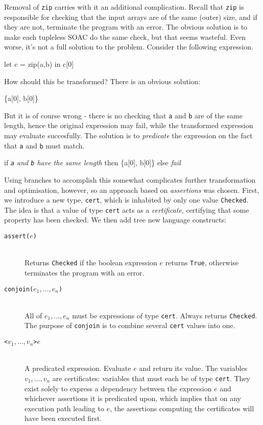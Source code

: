 Removal of \texttt{zip} carries with it an additional complication.
Recall that \texttt{zip} is responsible for checking that the input
arrays are of the same (outer) size, and if they are not, terminate
the program with an error.  The obvious solution is to make each
tupleless SOAC do the same check, but that seems wasteful.  Even
worse, it's not a full solution to the problem.  Consider the
following expression.
\begin{colorcode}
let c = zip(a,b) in
c[0]
\end{colorcode}
How should this be transformed?  There is an obvious solution:
\begin{colorcode}
\{a[0], b[0]\}
\end{colorcode}
But it is of course wrong - there is no checking that \texttt{a} and
\texttt{b} are of the same length, hence the original expression may
fail, while the transformed expression may evaluate succesfully.  The
solution is to \textit{predicate} the expression on the fact that
\texttt{a} and \texttt{b} must match.
\begin{colorcode}
if \textit{\texttt{a} and \texttt{b} have the same length}
then \{a[0], b[0]\}
else \textit{fail}
\end{colorcode}
Using branches to accomplish this somewhat complicates further
transformation and optimisation, however, so an approach based on
\textit{assertions} was chosen.  First, we introduce a new type,
\texttt{cert}, which is inhabited by only one value \texttt{Checked}.
The idea is that a value of type \texttt{cert} acts as a
\textit{certificate}, certifying that some property has been checked.
We then add tree new language constructs:

\begin{description}
\item[\texttt{assert($e$)}]\hfill\\
  Returns \texttt{Checked} if the boolean expression $e$ returns
  \texttt{True}, otherwise terminates the program with an error.

\item[\texttt{conjoin($e_{1}, \ldots, e_{n}$)}]\hfill\\
  All of $e_{1}, \ldots, e_{n}$ must be expressions of type
  \texttt{cert}.  Always returns \texttt{Checked}.  The purpose of
  \texttt{conjoin} is to combine several \texttt{cert} values into
  one.

\item[\texttt{<$v_{1},\ldots,v_{n}$>$e$}]\hfill\\
  A predicated expression.  Evaluate $e$ and return its value.  The
  variables $v_{1},\ldots,v_{n}$ are certificates: variables that must
  each be of type \texttt{cert}.  They exist solely to express a
  dependency between the expression $e$ and whichever assertions it is
  predicated upon, which implies that on any execution path leading to
  $e$, the assertions computing the certificates will have been
  executed first.
\end{description}

